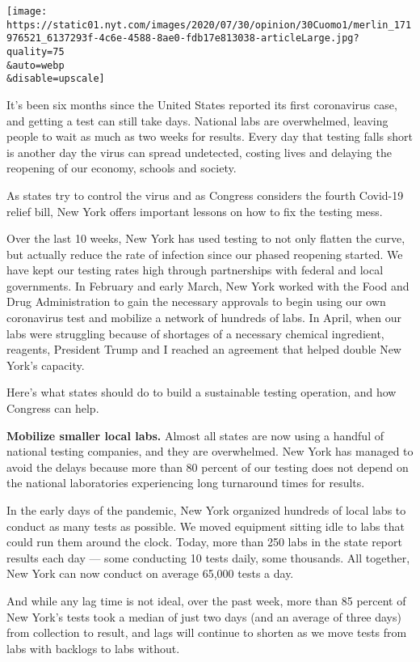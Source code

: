 \texttt{[image: https://static01.nyt.com/images/2020/07/30/opinion/30Cuomo1/merlin\_171976521\_6137293f-4c6e-4588-8ae0-fdb17e813038-articleLarge.jpg?quality=75\\\&auto=webp\\\&disable=upscale]}

It's been six months since the United States reported its first
coronavirus case, and getting a test can still take days. National labs
are overwhelmed, leaving people to wait as much as two weeks for
results. Every day that testing falls short is another day the virus can
spread undetected, costing lives and delaying the reopening of our
economy, schools and society.

As states try to control the virus and as Congress considers the fourth
Covid-19 relief bill, New York offers important lessons on how to fix
the testing mess.

Over the last 10 weeks, New York has used testing to not only flatten
the curve, but actually reduce the rate of infection since our phased
reopening started. We have kept our testing rates high through
partnerships with federal and local governments. In February and early
March, New York worked with the Food and Drug Administration to gain the
necessary approvals to begin using our own coronavirus test and mobilize
a network of hundreds of labs. In April, when our labs were struggling
because of shortages of a necessary chemical ingredient, reagents,
President Trump and I reached an agreement that helped double New York's
capacity.

Here's what states should do to build a sustainable testing operation,
and how Congress can help.

\textbf{Mobilize smaller local labs.} Almost all states are now using a
handful of national testing companies, and they are overwhelmed. New
York has managed to avoid the delays because more than 80 percent of our
testing does not depend on the national laboratories experiencing long
turnaround times for results.

In the early days of the pandemic, New York organized hundreds of local
labs to conduct as many tests as possible. We moved equipment sitting
idle to labs that could run them around the clock. Today, more than 250
labs in the state report results each day --- some conducting 10 tests
daily, some thousands. All together, New York can now conduct on average
65,000 tests a day.

And while any lag time is not ideal, over the past week, more than 85
percent of New York's tests took a median of just two days (and an
average of three days) from collection to result, and lags will continue
to shorten as we move tests from labs with backlogs to labs without.

